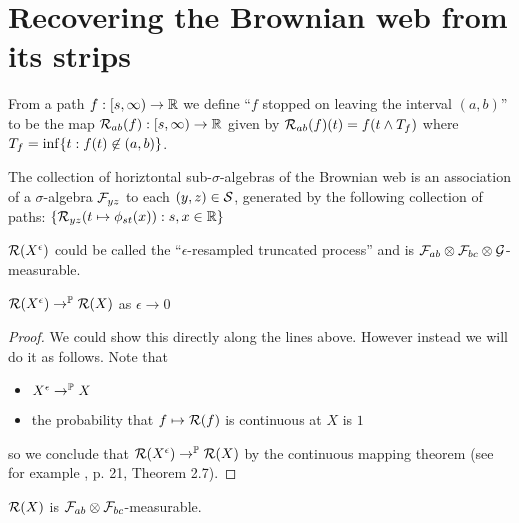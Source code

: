 {
\section{Recovering the Brownian web from its strips}

\begin{definition}
  \newcommand{\T}{\stripleavetime{f}}
  \label{def:restrict}
  From a path $f : [s, \infty) \to \mathbb{R}$ we define ``$f$ stopped on
    leaving the interval $(a,b)$'' to be the map $\mathcal{R}_{{a}{b}}(f) : [s,
      \infty) \to \mathbb{R}$ given by $\restrict{a}{b}{f}(t) = f(t \minsym \T)$
      where $\T = \inf\{ t : f(t) \not\in (a,b) \}$.
\end{definition}

\newcommand{\brownianwebnoise}{collection of horiztontal
  sub-$\sigma$-algebras of the Brownian web}

\begin{definition}
  The \brownianwebnoise{} is an
  association of a $\sigma$-algebra $\mathcal{F}_{y z}$ to each $(y, z)
  \in \mathcal{S}$, generated by the following collection of paths:
  $\{ \mathcal{R}_{{y}{z}}(t \mapsto \phi_{{s}{t}}(x)) : s, x \in \mathbb{R} \}$
\end{definition}

\begin{observation}
  $\mathcal{R}(X^{\epsilon})$ could be called the ``$\epsilon$-resampled
  truncated process'' and is $\mathcal{F}_{a b} \otimes \mathcal{F}_{b c}
  \otimes \mathcal{G}$-measurable.
\end{observation}

\begin{lemma}
  $\mathcal{R}(X^{\epsilon}) \to^{\mathbb{P}} \mathcal{R}(X)$ as $\epsilon \to 0$
\end{lemma}

\begin{proof}
  We could show this directly along the lines above.  However instead
  we will do it as follows.  Note that
  \begin{itemize}
  \item $X^{\epsilon} \to^{\mathbb{P}} X$
  \item the probability that $f \mapsto \mathcal{R}(f)$ is continuous
    at $X$ is $1$
  \end{itemize}
  so we conclude that $\mathcal{R}(X^{\epsilon}) \to^{\mathbb{P}}
  \mathcal{R}(X)$ by the continuous mapping theorem (see for
  example \cite{billingsley}, p. 21, Theorem 2.7).
\end{proof}

\begin{lemma}
  $\mathcal{R}(X)$ is $\mathcal{F}_{a b} \otimes
  \mathcal{F}_{b c}$-measurable.
\end{lemma}

}
